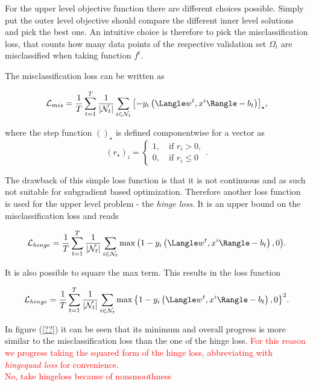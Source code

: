 For the upper level objective function there are different choices possible.
Simply put the outer level objective should compare the different inner level solutions and pick the best one. An intuitive choice is therefore to pick the misclassification loss, that counts how many data points of the respective validation set \(\Omega_t\) are misclassified when taking function \(f^t\).

The misclassification loss can be written as

\begin{equation}
	\mathcal{L}_{mis} = \frac{1}{T}\sum_{t=1}^T\frac{1}{|\mathcal{N}_t|}\sum_{i \in \mathcal{N}_t}{\left[-y_i\left(\Langle w^t,x^i\Rangle-b_t\right)\right]_{\star}},
\label{misclass_loss}
\end{equation}

where the step function \(()_{\star}\) is defined componentwise for a vector as
\begin{equation}
	(r_{\star})_i = \left\{\begin{array}{c} 1, \quad \text{if } r_i > 0, \\ 0, \quad \text{if } r_i \leq 0 \end{array} \right. .
\label{step_fun}
\end{equation}

The drawback of this simple loss function is that it is not continuous and as such not suitable for subgradient based optimization. Therefore another loss function is used for the upper level problem - the \emph{hinge loss}. It is an upper bound on the misclassification loss and reads

\begin{equation}
		\mathcal{L}_{hinge} = \frac{1}{T}\sum_{t=1}^T\frac{1}{|\mathcal{N}_t|}\sum_{i \in \mathcal{N}_t}{\max\left(1-y_i\left(\Langle w^t,x^i\Rangle-b_t\right),0\right)}.
\label{hinge_loss}
\end{equation}

It is also possible to square the max term. This results in the loss function

\begin{equation}
		\mathcal{L}_{hinge} = \frac{1}{T}\sum_{t=1}^T\frac{1}{|\mathcal{N}_t|}\sum_{i \in \mathcal{N}_t}{\max\left\{1-y_i\left(\Langle w^t,x^i\Rangle-b_t\right),0\right\}^2}.
\label{hingequad_loss}
\end{equation}

In figure (\ref{??}) it can be seen that its minimum and overall progress is more similar to the misclassification loss than the one of the hinge loss. 
\textcolor{red}{For this reason we progress taking the squared form of the hinge loss, abbreviating with \emph{hingequad loss} for convenience.\\
No, take hingeloss because of nonsmoothness}

